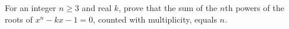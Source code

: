 For an integer $n\ge3$ and real $k$, prove that the sum of the $n$th powers of the roots of $x^n-kx-1=0$, counted with multiplicity, equals $n$.
